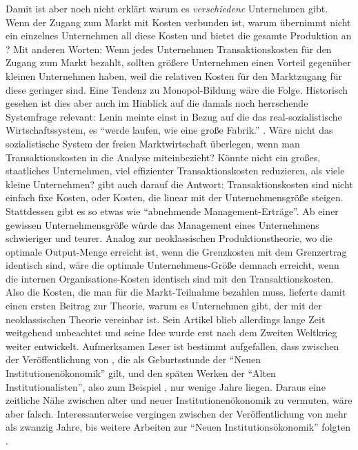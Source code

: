 Damit ist aber noch nicht erklärt warum es \textit{verschiedene} Unternehmen gibt. Wenn der Zugang zum Markt mit Kosten verbunden ist, warum übernimmt nicht ein einzelnes Unternehmen all diese Kosten und bietet die gesamte Produktion an \parencite[S. 394]{Coase1937}? Mit anderen Worten: Wenn jedes Unternehmen Transaktionskosten für den Zugang zum Markt bezahlt, sollten größere Unternehmen einen Vorteil gegenüber kleinen Unternehmen haben, weil die relativen Kosten für den Marktzugang für diese geringer sind. Eine Tendenz zu Monopol-Bildung wäre die Folge. Historisch gesehen ist dies aber auch im Hinblick auf die damals noch herrschende Systemfrage relevant: Lenin meinte einst in Bezug auf die das real-sozialistische Wirtschaftssystem, es "`werde laufen, wie eine große Fabrik."' \parencite[S. 113]{Warsh}. Wäre nicht das sozialistische System der freien Marktwirtschaft überlegen, wenn man Transaktionskosten in die Analyse miteinbezieht? Könnte nicht ein großes, staatliches Unternehmen, viel effizienter Transaktionskosten reduzieren, als viele kleine Unternehmen? \textcite[S. 395]{Coase1937} gibt auch darauf die Antwort: Transaktionskosten sind nicht einfach fixe Kosten, oder Kosten, die linear mit der Unternehmensgröße steigen. Stattdessen gibt es so etwas wie "`abnehmende Management-Erträge"'. Ab einer gewissen Unternehmensgröße würde das Management eines Unternehmens schwieriger und teurer. Analog zur neoklassischen Produktionstheorie, wo die optimale Output-Menge erreicht ist, wenn die Grenzkosten mit dem Grenzertrag identisch sind, wäre die optimale Unternehmens-Größe demnach erreicht, wenn die internen Organisations-Kosten identisch sind mit den Transaktionskosten. Also die Kosten, die man für die Markt-Teilnahme bezahlen muss. \textcite{Coase1937} lieferte damit einen ersten Beitrag zur Theorie, warum es Unternehmen gibt, der mit der neoklassischen Theorie vereinbar ist. Sein Artikel blieb allerdings lange Zeit weitgehend unbeachtet \parencite{Coase1991a} und seine Idee wurde erst nach dem Zweiten Weltkrieg weiter entwickelt. Aufmerksamen Leser ist bestimmt aufgefallen, dass zwischen der Veröffentlichung von \textcite{Coase1937}, die als Geburtsstunde der "`Neuen Institutionenökonomik"' gilt, und den späten Werken der "`Alten Institutionalisten"', also zum Beispiel \textcite{Commons1934}, nur wenige Jahre liegen. Daraus eine zeitliche Nähe zwischen alter und neuer Institutionenökonomik zu vermuten, wäre aber falsch. Interessanterweise vergingen zwischen der Veröffentlichung von \textcite{Coase1937} mehr als zwanzig Jahre, bis weitere Arbeiten zur "`Neuen Institutionsökonomik"' folgten \parencite[S. 148]{Blaug2001}.


